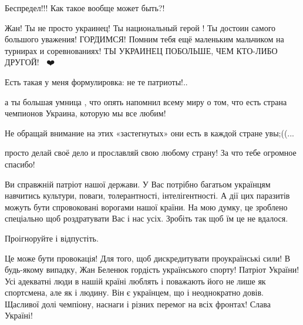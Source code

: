 \begin{itemize}
Беспредел!!! Как такое вообще может быть?!

Жан! Ты не просто украинец! Ты национальный герой ! Ты достоин самого большого
уважения! ГОРДИМСЯ! Помним тебя ещё маленьким мальчиком на турнирах и
соревнованиях! ТЫ УКРАИНЕЦ ПОБОЛЬШЕ, ЧЕМ КТО-ЛИБО ДРУГОЙ! 🙏💪❤️


Есть такая у меня формулировка: не те патриоты!..

а ты большая умница , что опять напомнил всему миру о том, что есть страна
чемпионов Украина, которую мы все любим!

Не обращай внимание на этих «застегнутых» они есть в каждой стране увы;((...

просто делай своё дело и прославляй свою любому страну! За что тебе огромное
спасибо!

 
Ви справжній патріот нашої держави. У Вас потрібно багатьом українцям навчитись
культури, поваги, толерантності, інтелігентності. А дії цих паразитів
можуть бути спровоковані ворогами нашої країни. На мою думку, це зроблено
спеціально щоб роздратувати Вас і нас усіх. Зробіть так щоб їм це не вдалося.

Проігноруйте і відпустіть.

 
Це може бути провокація! Для того, щоб дискредитувати проукраїнські сили! В
будь-якому випадку, Жан Беленюк гордість українського спорту! Патріот України!
Усі адекватні люди в нашій країні люблять і поважають його не лише як
спортсмена, але як і людину. Він є українцем, що і неоднократно довів. Щасливої
долі чемпіону, наснаги і різних перемог на всіх фронтах! Слава Україні!



\end{itemize}

